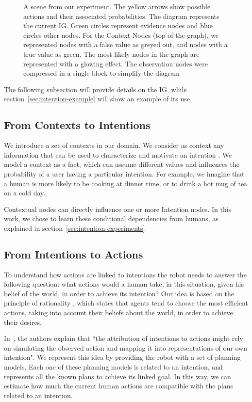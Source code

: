\begin{figure}[ht!]
	\caption[Intention Graph]{A scene from our experiment. The yellow arrows show possible actions and their associated probabilities. The diagram represents the current IG. Green circles represent evidence nodes and blue circles other nodes. For the Context Nodes (top of the graph), we represented nodes with a false value as greyed out, and nodes with a true value as green. The most likely nodes in the graph are represented with a glowing effect. The observation nodes were compressed in a single block to simplify the diagram}
	\label{fig:intention-intention_graph}
\end{figure}

The following subsection will provide details on the IG, while section~\ref{sec:intention-example} will show an example of its use.

\subsection{From Contexts to Intentions}
We introduce a set of contexts in our domain. We consider as context any information that can be used to characterize and motivate an intention \citep{abowd1999towards}. We model a context  as a fact, which can assume different values and influences the probability of a user having a particular intention. For example, we imagine that a human is more likely to be cooking at dinner time, or to drink a hot mug of tea on a cold day.

Contextual nodes can directly influence one or more Intention nodes. In this work, we chose to learn these conditional dependencies from humans, as explained in section~\ref{sec:intention-experiments}.

\subsection{From Intentions to Actions}
\label{sec:intention-action_evaluation}
To understand how actions are linked to intentions the robot needs to answer the following question: what actions would a human take, in this situation, given his belief of the world, in order to achieve its intention?
Our idea is based on the principle of rationality \citep{Dennet1989}, which states that agents tend to choose the most efficient actions, taking into account their beliefs about the world, in order to achieve their desires.

In~\cite{Blakemore2001}, the authors explain that ``the attribution of intentions to actions might rely on simulating the observed action and mapping it into representations of our own intention". We represent this idea by providing the robot with a set of planning models. Each one of these planning models is related to an intention, and represents all the known plans to achieve its linked goal. In this way, we can estimate how much the current human actions are compatible with the plans related to an intention.

